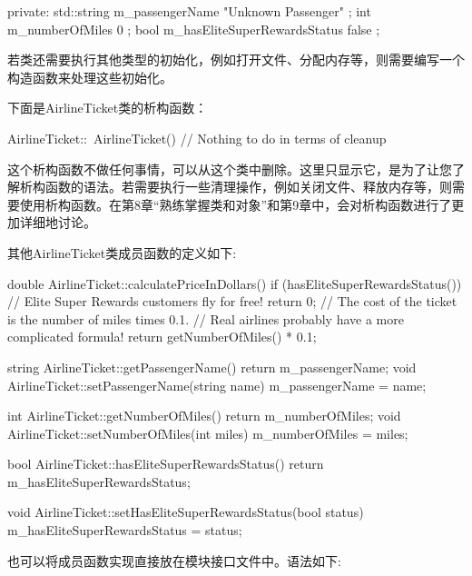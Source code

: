 \begin{cpp}
private:
    std::string m_passengerName { "Unknown Passenger" };
    int m_numberOfMiles { 0 };
    bool m_hasEliteSuperRewardsStatus { false };
\end{cpp}

若类还需要执行其他类型的初始化，例如打开文件、分配内存等，则需要编写一个构造函数来处理这些初始化。

下面是AirlineTicket类的析构函数：

\begin{cpp}
AirlineTicket::~AirlineTicket()
{
    // Nothing to do in terms of cleanup
}
\end{cpp}

这个析构函数不做任何事情，可以从这个类中删除。这里只显示它，是为了让您了解析构函数的语法。若需要执行一些清理操作，例如关闭文件、释放内存等，则需要使用析构函数。在第8章“熟练掌握类和对象”和第9章中，会对析构函数进行了更加详细地讨论。

其他AirlineTicket类成员函数的定义如下:

\begin{cpp}
double AirlineTicket::calculatePriceInDollars()
{
    if (hasEliteSuperRewardsStatus()) {
        // Elite Super Rewards customers fly for free!
        return 0;
    }
    // The cost of the ticket is the number of miles times 0.1.
    // Real airlines probably have a more complicated formula!
    return getNumberOfMiles() * 0.1;
}

string AirlineTicket::getPassengerName() { return m_passengerName; }
void AirlineTicket::setPassengerName(string name) { m_passengerName = name; }

int AirlineTicket::getNumberOfMiles() { return m_numberOfMiles; }
void AirlineTicket::setNumberOfMiles(int miles) { m_numberOfMiles = miles; }

bool AirlineTicket::hasEliteSuperRewardsStatus()
{
    return m_hasEliteSuperRewardsStatus;
}

void AirlineTicket::setHasEliteSuperRewardsStatus(bool status)
{
    m_hasEliteSuperRewardsStatus = status;
}
\end{cpp}

也可以将成员函数实现直接放在模块接口文件中。语法如下:

